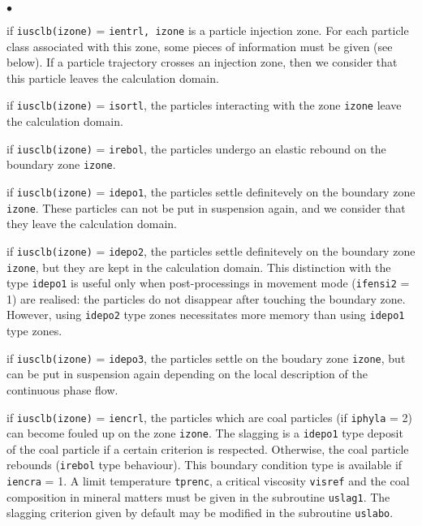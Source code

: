{{{{\begin{list}{$\bullet$}{}

 \item if \texttt{iusclb(izone)} = \texttt{ientrl, izone} is a particle injection zone.
       For each particle class associated with this zone, some pieces of
       information must be given (see below). If a particle trajectory
       crosses an injection zone, then we consider that this particle
       leaves the calculation domain.

 \item if \texttt{iusclb(izone)} = \texttt{isortl}, the particles interacting with
       the zone \texttt{izone} leave the calculation domain.

 \item if \texttt{iusclb(izone)} = \texttt{irebol}, the particles undergo an elastic
       rebound on the boundary zone \texttt{izone}.

 \item if \texttt{iusclb(izone)} = \texttt{idepo1}, the particles settle definitevely on
       the boundary zone \texttt{izone}. These particles can not be put in suspension
       again, and we consider that they leave the calculation domain.

 \item if \texttt{iusclb(izone)} = \texttt{idepo2}, the particles settle definitevely on
       the boundary zone \texttt{izone}, but they are kept in the calculation
       domain. This distinction with the type \texttt{idepo1} is useful only when
       post-processings in movement mode (\texttt{ifensi2} = 1) are realised: the
       particles do not disappear after touching the boundary
       zone. However, using \texttt{idepo2} type zones necessitates more memory
       than using \texttt{idepo1} type zones.

 \item if \texttt{iusclb(izone)} = \texttt{idepo3}, the particles settle on the boudary
       zone \texttt{izone}, but can be put in suspension again depending on the
       local description of the continuous phase flow.

 \item if \texttt{iusclb(izone)} = \texttt{iencrl}, the particles which are coal particles
       (if \texttt{iphyla} = 2) can become fouled up on the zone \texttt{izone}. The
       slagging is a \texttt{idepo1} type deposit of the coal particle if a certain
       criterion is respected. Otherwise, the coal particle rebounds
       (\texttt{irebol} type behaviour). This boundary condition type is available
       if \texttt{iencra} = 1. A limit temperature \texttt{tprenc}, a
       critical viscosity \texttt{visref} and the coal composition
       in mineral matters must be given in the subroutine
       \texttt{uslag1}. The slagging criterion given by default may be
       modified in the subroutine \texttt{uslabo}.


\end{list}}}}}
